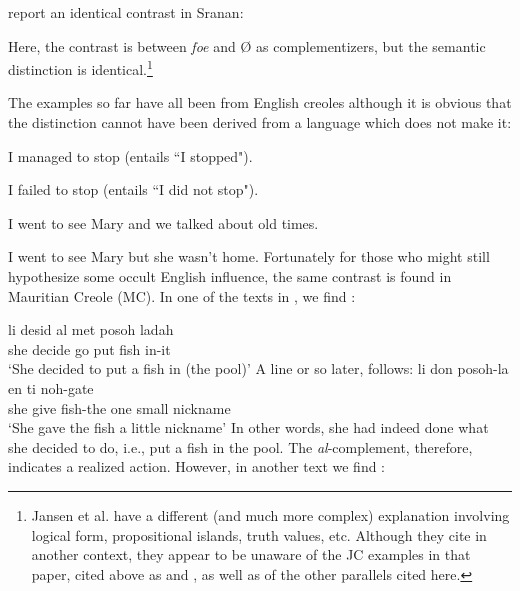 \citet{JansenEtAl1978} report an identical contrast in Sranan:

\z

\label{ex:2:30}\z
Here, the contrast is between \textit{foe} and {\O} as complementizers, but the
semantic distinction is identical.\footnote{Jansen et al. have a different (and much more complex) explanation involving logical form, propositional islands, truth values, etc. Although they cite \citet{Roberts1975} in another context, they appear to be unaware of the JC examples in that paper, cited above as  and , as well as of the other parallels cited here.}

The examples so far have all been from English creoles although it is obvious that the distinction cannot have been derived from a lan\-guage which does not make it:

\ea\label{ex:2:31}
 {I} {managed} {to} {stop} {\rm (entails ``I stopped")}.
\z

\ea\label{ex:2:32}
 {I} {failed} {to} {stop} {\rm (entails ``I did not stop")}.
\z

\ea\label{ex:2:33}
I {went} {to} {see} {Mary} {and} {we} {talked} {about} {old} {times.}
\z

\ea\label{ex:2:34}
 {I} {went} {to} {see} {Mary} {but} {she} {wasn't} {home.}
\z
Fortunately for those who might still hypothesize some occult English influence, the same contrast is found in Mauritian Creole (MC). In one of the texts in \citet{Baker1972}, we find :

\ea\label{ex:2:35}
\gll  li desid al met posoh ladah \\
she decide go put fish in-it\\
\glt `She decided to put a fish in (the pool)'
\z
A line or so later,  follows:
\ea\label{ex:2:36}
 \gll li don posoh-la en ti noh-gate\\
she give fish-the one small nickname\\
\glt `She gave the fish a little nickname'
\z
% 
In other words, she had indeed done what she decided to do, i.e., put a fish in the pool. The \textit{al}-complement, therefore, indicates a realized action. However, in another text we find :

